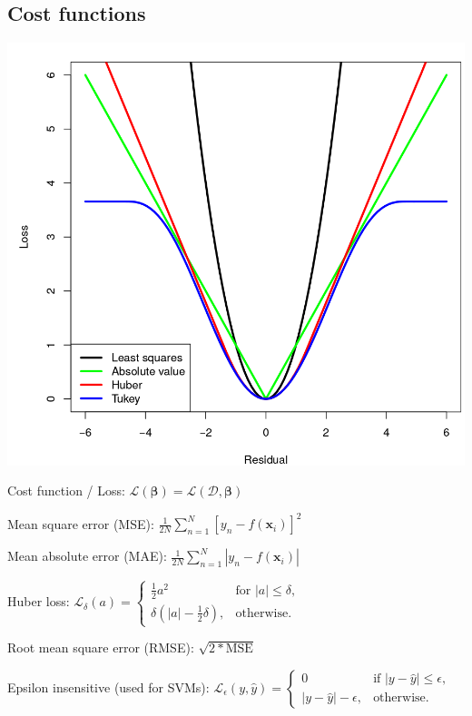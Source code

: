 \documentclass[10pt,a4paper,landscape]{article}
\begin{document}
\begin{multicols*}{4}
  \subsection{Cost functions}
  \begin{colfig}
    \centering
    \includegraphics[width=\linewidth]{images/error-functions.png}
  \end{colfig}

  Cost function / Loss: $\mathcal{L}(\boldsymbol\beta) = \mathcal{L}(\mathcal{D},\boldsymbol\beta)$

  Mean square error (MSE): $\frac{1}{2N} \sum_{n=1}^{N}\left[y_n-f(\mathbf{x}_i) \right]^2$

  Mean absolute error (MAE): $\frac{1}{2N} \sum_{n=1}^{N}\left | y_n-f(\mathbf{x}_i) \right |$

  Huber loss: $\mathcal{L}_\delta (a) = \begin{cases}
   \frac{1}{2}{a^2}                   & \text{for } |a| \le \delta, \\
   \delta (|a| - \frac{1}{2}\delta ), & \text{otherwise.}
  \end{cases}$

  Root mean square error (RMSE): $\sqrt{2 * \text{MSE}}$

  Epsilon insensitive (used for SVMs):
  $\mathcal{L}_{\epsilon}(y, \hat{y}) = \begin{cases}
   0                   & \text{if } |y - \hat y| \le \epsilon, \\
   |y - \hat y| - \epsilon, & \text{otherwise.}
  \end{cases}$


\end{multicols*}
\end{document}

